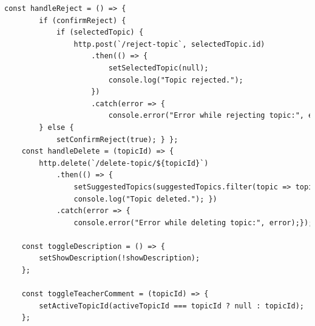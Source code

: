\documentclass[14pt]{extarticle} %
\begin{document}
\begin{lstlisting}[language=html, caption={Клиентская часть SuggestTopic}]
    const handleReject = () => {
        if (confirmReject) {
            if (selectedTopic) {
                http.post(`/reject-topic`, selectedTopic.id)
                    .then(() => {
                        setSelectedTopic(null);
                        console.log("Topic rejected.");
                    })
                    .catch(error => {
                        console.error("Error while rejecting topic:", error);}); }
        } else {
            setConfirmReject(true); } };
    const handleDelete = (topicId) => {
        http.delete(`/delete-topic/${topicId}`)
            .then(() => {
                setSuggestedTopics(suggestedTopics.filter(topic => topic.id !== topicId));
                console.log("Topic deleted."); })
            .catch(error => {
                console.error("Error while deleting topic:", error);});};

    const toggleDescription = () => {
        setShowDescription(!showDescription);
    };

    const toggleTeacherComment = (topicId) => {
        setActiveTopicId(activeTopicId === topicId ? null : topicId);
    };


\end{lstlisting}
\end{document}
